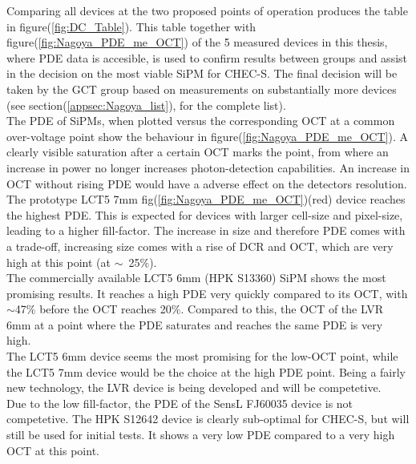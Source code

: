\documentclass[12pt,article,type=msc,colorback,accentcolor=tud9c]{tudthesis}
\begin{document}
Comparing all devices at the two proposed points of operation produces the table in figure(\ref{fig:DC_Table}). This table together with figure(\ref{fig:Nagoya_PDE_me_OCT}) of the 5 measured devices in this thesis, where PDE data is accesible, is used to confirm results between groups and assist in the decision on the most viable SiPM for CHEC-S. The final decision will be taken by the GCT group based on measurements on substantially more devices (see section(\ref{appsec:Nagoya_list}), for the complete list).\\
The PDE of SiPMs, when plotted versus the corresponding OCT at a common over-voltage point show the behaviour in figure(\ref{fig:Nagoya_PDE_me_OCT}). A clearly visible saturation  after a certain OCT marks the point, from where an increase in power no longer increases photon-detection capabilities. An increase in OCT without rising PDE would have a adverse effect on the detectors resolution.\\
The prototype LCT5 7mm fig(\ref{fig:Nagoya_PDE_me_OCT})(red) device reaches the highest PDE. This is expected for devices with larger cell-size and pixel-size, leading to a higher fill-factor. The increase in size and therefore PDE comes with a trade-off, increasing size comes with a rise of DCR and OCT, which are very high at this point (at $\sim$~25$\%$).\\
The commercially available LCT5 6mm (HPK S13360) SiPM shows the most promising results. It reaches a high PDE very quickly compared to its OCT, with $\sim$47$\%$ before the OCT reaches 20$\%$. Compared to this, the OCT of the LVR 6mm at a point where the PDE saturates and reaches the same PDE is very high.\\
The LCT5 6mm device seems the most promising for the low-OCT point, while the LCT5 7mm device would be the choice at the high PDE point. Being a fairly new technology, the LVR device is being developed and will be competetive.\\
Due to the low fill-factor, the PDE of the SensL FJ60035 device is not competetive.
The HPK S12642 device is clearly sub-optimal for CHEC-S, but will still be used for initial tests. It shows a very low PDE compared to a very high OCT at this point.











\end{document}
